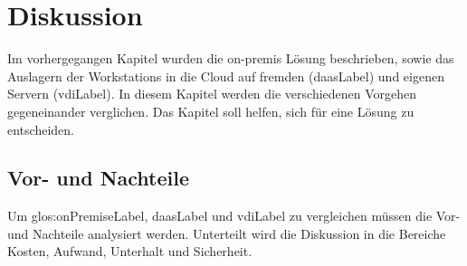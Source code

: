 
\chapter{Diskussion}
Im vorhergegangen Kapitel wurden die on-premis Lösung beschrieben, sowie das Auslagern der Workstations in die Cloud auf fremden (\Gls{daasLabel}) und eigenen Servern (\Gls{vdiLabel}). In diesem Kapitel werden die verschiedenen Vorgehen gegeneinander verglichen. Das Kapitel soll helfen, sich für eine Lösung zu entscheiden.


\section{Vor- und Nachteile}




Um \gls{glos:onPremiseLabel}, \Gls{daasLabel} und \Gls{vdiLabel} zu vergleichen müssen die Vor- und Nachteile analysiert werden.
Unterteilt wird die Diskussion in die Bereiche Kosten, Aufwand, Unterhalt und Sicherheit.

